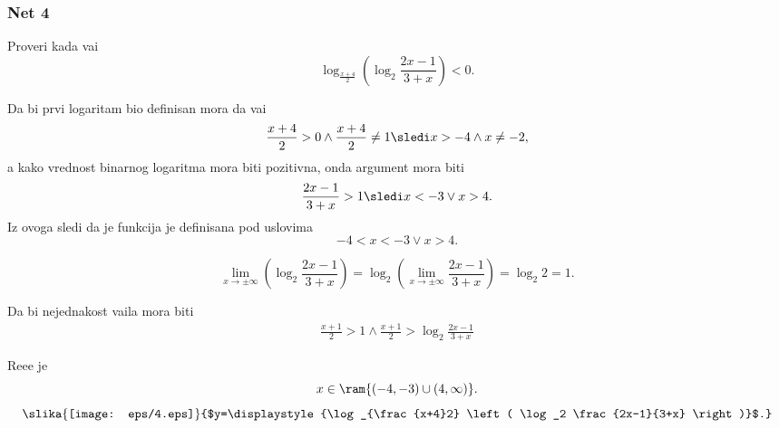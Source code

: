 \subsubsection{Net 4}

\zadatak Proveri kada va{\zv}i
$$
\log_{\frac{x+4}2} \left( \log_2 \frac{2x-1}{3+x} \right) < 0.
$$

\resenje
Da bi prvi logaritam bio definisan mora da va{\zv}i
$$
\frac{x+4}2>0 \land \frac{x+4}2\ne 1 \sledi
x>-4 \land x\ne -2,
$$
a kako vrednost binarnog logaritma mora biti pozitivna, onda argument mora biti
$$
\frac{2x-1}{3+x} >1\sledi x<-3 \lor x>4.
$$
Iz ovoga sledi da je funkcija je definisana pod uslovima
$$
-4<x<-3 \lor x>4.
$$

$$
\lim_{x\to \pm\infty}\left(\log_2 \frac{2x-1}{3+x}\right) =
\log_2\left(\lim_{x\to \pm\infty}\frac{2x-1}{3+x}\right) =
\log_2 2 = 1.
$$

Da bi nejednakost va{\zv}ila mora biti
\begin{align*}
    \frac{x+1}2 > 1 \land  \frac{x+1}2 > \log_2 \frac{2x-1}{3+x}  
\end{align*}

Re{\sv}e{\nj}e  je
$$
x \in \ram{(-4, -3) \cup ( 4, \infty )}.
$$
$$
\slika{\texttt{[image: eps/4.eps]}}{$y=\displaystyle{\log_{\frac{x+4}2} \left( \log_2 \frac{2x-1}{3+x} \right)}$.}
$$
